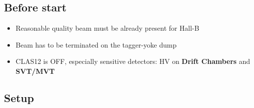 
\subsection{Before start}

\begin{itemize}
\item Reasonable quality beam must be already present for Hall-B
\item Beam has to be terminated on the tagger-yoke dump
\item CLAS12 is OFF, especially sensitive detectors: HV on \textbf{Drift Chambers} and \textbf{SVT/MVT}
\end{itemize}


\subsection{Setup }

